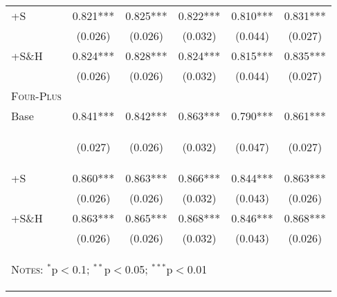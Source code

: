 \begin{table}[htpb!]
\begin{center}
\begin{tabular}{lccccc}
+S&0.821***&0.825***&0.822***&0.810***&0.831***\\
&(0.026)&(0.026)&(0.032)&(0.044)&(0.027)\\
+S\&H&0.824***&0.828***&0.824***&0.815***&0.835***\\
&(0.026)&(0.026)&(0.032)&(0.044)&(0.027)\\
\textsc{Four-Plus}&&&&&\\
Base&0.841***&0.842***&0.863***&0.790***&0.861***\\
&\begin{footnotesize}(0.027)\end{footnotesize}&\begin{footnotesize}(0.026)\end{footnotesize}&\begin{footnotesize}(0.032)\end{footnotesize}&\begin{footnotesize}(0.047)\end{footnotesize}&\begin{footnotesize}(0.027)\end{footnotesize}\\
+S&0.860***&0.863***&0.866***&0.844***&0.863***\\
&(0.026)&(0.026)&(0.032)&(0.043)&(0.026)\\
+S\&H&0.863***&0.865***&0.868***&0.846***&0.868***\\
&(0.026)&(0.026)&(0.032)&(0.043)&(0.026)\\

\midrule\multicolumn{6}{p{12.5cm}}{\begin{footnotesize}\textsc{Notes:} $^{*}$p$<$0.1; $^{**}$p$<$0.05; $^{***}$p$<$0.01 
\end{footnotesize}} \\ \bottomrule 
\end{tabular}\end{center}\end{table}